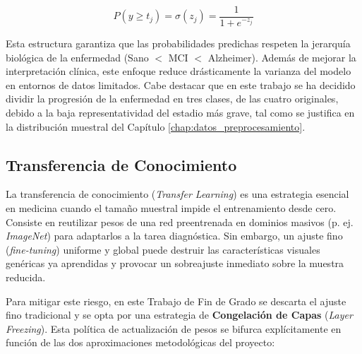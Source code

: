 \documentclass[12pt, oneside, english, spanish]{book}
\begin{document}
\begin{equation}
	P(y \geq t_j) = \sigma(z_j) = \frac{1}{1 + e^{-z_j}}
\end{equation}

Esta estructura garantiza que las probabilidades predichas respeten la jerarquía biológica de la enfermedad (Sano $<$ MCI $<$ Alzheimer). Además de mejorar la interpretación clínica, este enfoque reduce drásticamente la varianza del modelo en entornos de datos limitados. Cabe destacar que en este trabajo se ha decidido dividir la progresión de la enfermedad en tres clases, de las cuatro originales, debido a la baja representatividad del estadio más grave, tal como se justifica en la distribución muestral del Capítulo \ref{chap:datos_preprocesamiento}.

\subsection{Transferencia de Conocimiento} \label{subsec:transfer_learning_teoria}

La transferencia de conocimiento (\textit{Transfer Learning}) es una estrategia esencial en medicina cuando el tamaño muestral impide el entrenamiento desde cero. Consiste en reutilizar pesos de una red preentrenada en dominios masivos (p. ej. \textit{ImageNet}) para adaptarlos a la tarea diagnóstica. Sin embargo, un ajuste fino (\textit{fine-tuning}) uniforme y global puede destruir las características visuales genéricas ya aprendidas y provocar un sobreajuste inmediato sobre la muestra reducida.

Para mitigar este riesgo, en este Trabajo de Fin de Grado se descarta el ajuste fino tradicional y se opta por una estrategia de \textbf{Congelación de Capas} (\textit{Layer Freezing}). Esta política de actualización de pesos se bifurca explícitamente en función de las dos aproximaciones metodológicas del proyecto:
\end{document}
